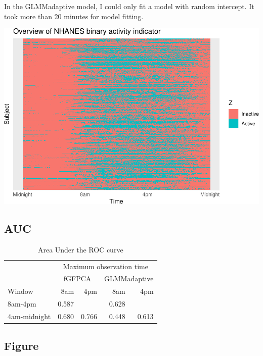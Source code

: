\documentclass[
]{article}
\begin{document}
In the GLMMadaptive model, I could only fit a model with random
intercept. It took more than 20 minutes for model fitting.

\includegraphics{manuscript_files/figure-latex/nhance_example-1.pdf}

\hypertarget{auc-2}{%
\subsection{AUC}\label{auc-2}}

\begin{table}

\caption{\label{tab:unnamed-chunk-12}Area Under the ROC curve}
\centering
\begin{tabular}[t]{lrrrr}
\toprule
\multicolumn{1}{c}{ } & \multicolumn{4}{c}{Maximum observation time} \\
\cmidrule(l{3pt}r{3pt}){2-5}
\multicolumn{1}{c}{ } & \multicolumn{2}{c}{fGFPCA} & \multicolumn{2}{c}{GLMMadaptive} \\
\cmidrule(l{3pt}r{3pt}){2-3} \cmidrule(l{3pt}r{3pt}){4-5}
Window & 8am & 4pm & 8am & 4pm\\
\midrule
8am-4pm & 0.587 &  & 0.628 & \\
4am-midnight & 0.680 & 0.766 & 0.448 & 0.613\\
\bottomrule
\end{tabular}
\end{table}

\hypertarget{figure-2}{%
\subsection{Figure}\label{figure-2}}
\end{document}
